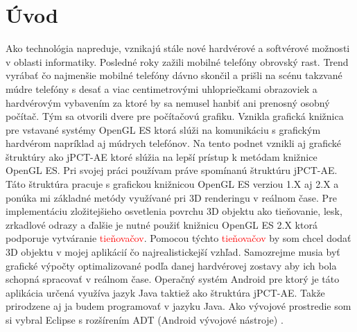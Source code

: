 \chapter*{Úvod}\label{chap:uvod}

Ako technológia napreduje, vznikajú stále nové hardvérové a softvérové možnosti v oblasti informatiky. Posledné roky zažili mobilné telefóny obrovský rast. Trend vyrábať čo najmenšie mobilné telefóny dávno skončil a prišli na scénu takzvané múdre telefóny s desať a viac centimetrovými uhlopriečkami obrazoviek a hardvérovým vybavením za ktoré by sa nemusel hanbiť ani prenosný osobný počítač. Tým sa otvorili dvere pre počítačovú grafiku. Vznikla grafická knižnica pre vstavané systémy OpenGL ES \cite{gro} ktorá slúži na komunikáciu s grafickým hardvérom napríklad aj múdrych telefónov. Na tento podnet vznikli aj grafické štruktúry ako jPCT-AE \cite{ols} ktoré slúžia na lepší prístup k metódam knižnice OpenGL ES. Pri svojej práci používam práve spomínanú štruktúru jPCT-AE. Táto štruktúra pracuje s grafickou knižnicou OpenGL ES verziou 1.X aj 2.X a ponúka mi základné metódy využívané pri 3D renderingu v reálnom čase. Pre implementáciu zložitejšieho osvetlenia povrchu 3D objektu ako tieňovanie, lesk, zrkadlové odrazy a ďalšie je nutné použiť knižnicu OpenGL ES 2.X ktorá podporuje vytváranie \textcolor{red}{tieňovačov}. Pomocou týchto \textcolor{red}{tieňovačov} by som chcel dodať 3D objektu v mojej aplikácií čo najrealistickejší vzhľad. Samozrejme musia byť grafické výpočty optimalizované podľa danej hardvérovej zostavy aby ich bola schopná spracovať v reálnom čase. Operačný systém Android pre ktorý je táto aplikácia určená využíva jazyk Java taktiež ako štruktúra jPCT-AE. Takže prirodzene aj ja budem programovať v jazyku Java. Ako vývojové prostredie som si vybral Eclipse \cite{fou} s rozšírením ADT (Android vývojové nástroje) \cite{pro}.